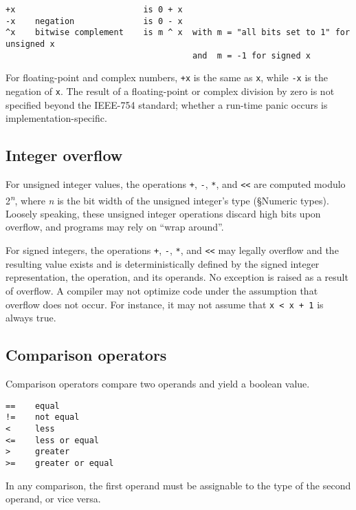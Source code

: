 \begin{Verbatim}[frame=single]
+x                          is 0 + x
-x    negation              is 0 - x
^x    bitwise complement    is m ^ x  with m = "all bits set to 1" for unsigned x
                                      and  m = -1 for signed x
\end{Verbatim}

For floating-point and complex numbers, \texttt{+x} is the same as
\texttt{x}, while \texttt{-x} is the negation of \texttt{x}. The result
of a floating-point or complex division by zero is not specified beyond
the IEEE-754 standard; whether a run-time panic occurs is implementation-specific.

\subsection*{Integer overflow}

For unsigned integer values, the operations \texttt{+}, \texttt{-},
\texttt{*}, and \texttt{\textless{}\textless{}} are computed modulo
2\textsuperscript{\emph{n}}, where \emph{n} is the bit width of the
unsigned integer's type (§Numeric types).
Loosely speaking, these unsigned integer operations discard high bits
upon overflow, and programs may rely on ``wrap around''.

For signed integers, the operations \texttt{+}, \texttt{-}, \texttt{*},
and \texttt{\textless{}\textless{}} may legally overflow and the
resulting value exists and is deterministically defined by the signed
integer representation, the operation, and its operands. No exception is
raised as a result of overflow. A compiler may not optimize code under
the assumption that overflow does not occur. For instance, it may not
assume that \texttt{x \textless{} x + 1} is always true.

\subsection*{Comparison operators}

Comparison operators compare two operands and yield a boolean value.

\begin{Verbatim}[frame=single]
==    equal
!=    not equal
<     less
<=    less or equal
>     greater
>=    greater or equal
\end{Verbatim}

In any comparison, the first operand must be
assignable to the type of the second operand,
or vice versa.

